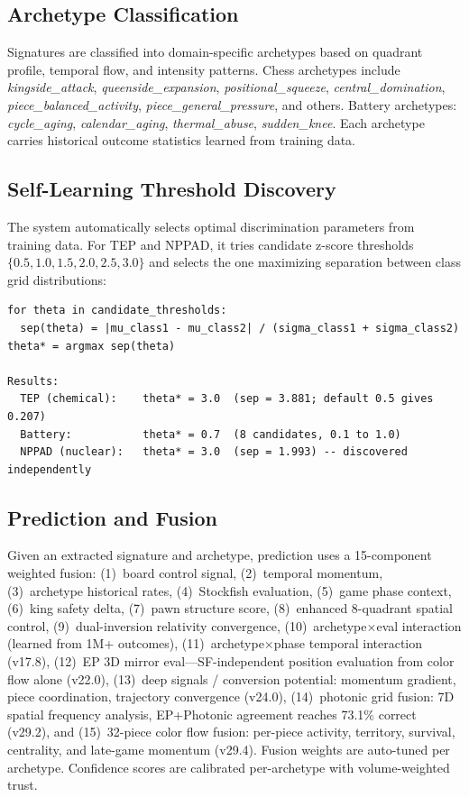 \documentclass[12pt,a4paper]{article}
\begin{document}
\subsection{Archetype Classification}

Signatures are classified into domain-specific archetypes based on quadrant profile, temporal flow,
and intensity patterns. Chess archetypes include \textit{kingside\_attack},
\textit{queenside\_expansion}, \textit{positional\_squeeze}, \textit{central\_domination},
\textit{piece\_balanced\_activity}, \textit{piece\_general\_pressure}, and others. Battery
archetypes: \textit{cycle\_aging}, \textit{calendar\_aging}, \textit{thermal\_abuse},
\textit{sudden\_knee}. Each archetype carries historical outcome statistics learned from training
data.

\subsection{Self-Learning Threshold Discovery}

The system automatically selects optimal discrimination parameters from training data. For TEP and
NPPAD, it tries candidate z-score thresholds $\{0.5, 1.0, 1.5, 2.0, 2.5, 3.0\}$ and selects the
one maximizing separation between class grid distributions:

\begin{verbatim}
for theta in candidate_thresholds:
  sep(theta) = |mu_class1 - mu_class2| / (sigma_class1 + sigma_class2)
theta* = argmax sep(theta)

Results:
  TEP (chemical):    theta* = 3.0  (sep = 3.881; default 0.5 gives 0.207)
  Battery:           theta* = 0.7  (8 candidates, 0.1 to 1.0)
  NPPAD (nuclear):   theta* = 3.0  (sep = 1.993) -- discovered independently
\end{verbatim}

\subsection{Prediction and Fusion}

Given an extracted signature and archetype, prediction uses a 15-component weighted fusion:
(1)~board control signal, (2)~temporal momentum, (3)~archetype historical rates,
(4)~Stockfish evaluation, (5)~game phase context, (6)~king safety delta,
(7)~pawn structure score, (8)~enhanced 8-quadrant spatial control, (9)~dual-inversion relativity
convergence, (10)~archetype$\times$eval interaction (learned from 1M+ outcomes),
(11)~archetype$\times$phase temporal interaction (v17.8),
(12)~EP 3D mirror eval---SF-independent position evaluation from color flow alone (v22.0),
(13)~deep signals / conversion potential: momentum gradient, piece coordination, trajectory
convergence (v24.0), (14)~photonic grid fusion: 7D spatial frequency analysis, EP+Photonic
agreement reaches 73.1\% correct (v29.2), and (15)~32-piece color flow fusion: per-piece
activity, territory, survival, centrality, and late-game momentum (v29.4).
Fusion weights are auto-tuned per archetype. Confidence scores are calibrated per-archetype
with volume-weighted trust.
\end{document}

